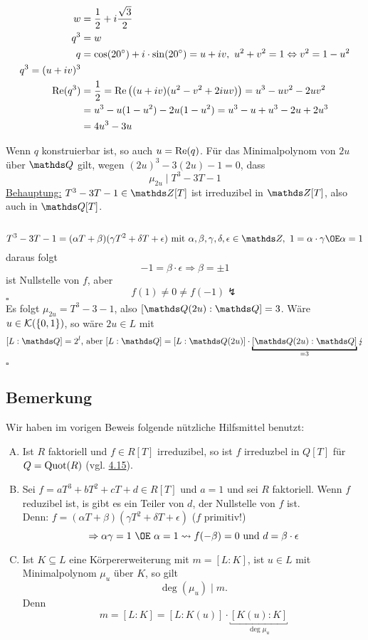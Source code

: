 \begin{minipage}{8cm}
	
\end{minipage}
\begin{minipage}{8cm}
	\begin{equation*}
	\begin{aligned}
		w&=\frac{1}{2}+i\frac{\sqrt{3}}{2}\\
		q^3&=w\\
		q&= \cos(20^\circ)+i\cdot \sin(20^\circ)=u+iv,~u^2+v^2=1\Leftrightarrow v^2=1-u^2\\
		q^3=(u+iv)^3\\
		\operatorname{Re}(q^3)&=\frac{1}{2}=\operatorname{Re} \big((u+iv)(u^2-v^2+2iuv) \big)=u^3-uv^2-2uv^2\\
		&=u^3-u(1-u^2)-2u(1-u^2)=u^3-u+u^3-2u+2u^3\\
		&=4u^3-3u
	\end{aligned}
	\end{equation*}
\end{minipage}
Wenn $q$ konstruierbar ist, so auch $u=\operatorname{Re}(q)$.
Für das Minimalpolynom von $2u$ über $\Q$ gilt, wegen $(2u)^3-3(2u)-1=0$, dass
\[
\mu_{2u}\mid T^3-3T-1
\]
\uline{Behauptung:} $T^3-3T-1\in \Z[T]$ ist irreduzibel in $\Z[T]$, also auch in $\Q[T]$.\\
\\
\[
T^3-3T-1=(\alpha T+\beta)(\gamma T^2+\delta T+\epsilon)\text{ mit } \alpha,\beta,\gamma,\delta,\epsilon\in \Z,~1=\alpha\cdot \gamma \OE \alpha=1
\]
daraus folgt
\[
-1=\beta\cdot\epsilon\Rightarrow \beta=\pm 1
\]
ist Nullstelle von $f$, aber
\[
f(1)\neq 0\neq f(-1)\lightning
\]
\hfill $\square$\\

Es folgt $\mu_{2u}=T^3-3-1$, also $[\Q(2u):\Q]=3$.
Wäre$u\in \mathcal{K}(\{0,1\})$, so wäre $2u\in L$ mit 
\[
[L:\Q]=2^l\text{, aber } [L:\Q]=[L:\Q(2u)]\cdot\underbracket{[\Q(2u):\Q]}_{=3}\lightning
\]
\hfill $\square$

\subsection{Bemerkung}
\label{sub:bemerkung}
Wir haben im vorigen Beweis folgende nützliche Hilfsmittel benutzt:
\begin{enumerate}[(A)]
	\item Ist $R$ faktoriell und $f\in R[T]$ irreduzibel, so ist $f$ irreduzbel in $Q[T]$ für $Q=\operatorname{Quot}(R)$ (vgl. \hyperref[sub:satz_18]{4.15}).
	\item Sei $f=aT^3+bT^2+cT+d\in R[T]$ und $a=1$ und sei $R$ faktoriell.
	Wenn $f$ reduzibel ist, is gibt es ein Teiler von $d$, der Nullstelle von $f$ ist.\\
	Denn: $f=(\alpha T+\beta)(\gamma T^2+\delta T+\epsilon)$ ($f$ primitiv!)
	\[
	\Rightarrow \alpha\gamma=1 ~\OE~\alpha=1\rightsquigarrow f(-\beta)=0\text{ und } d=\beta\cdot \epsilon
	\]
	\item Ist $K\subseteq L$ eine Körpererweiterung mit $m=[L:K]$, ist $u\in L$ mit Minimalpolynom $\mu_u$ über $K$, so gilt
	\[
	\deg(\mu_u)\mid m.
	\]
	Denn
	\[
	m=[L:K]=[L:K(u)]\cdot \underbracket{[K(u):K]}_{\deg \mu_u}
	\]
\end{enumerate}
\newpage
